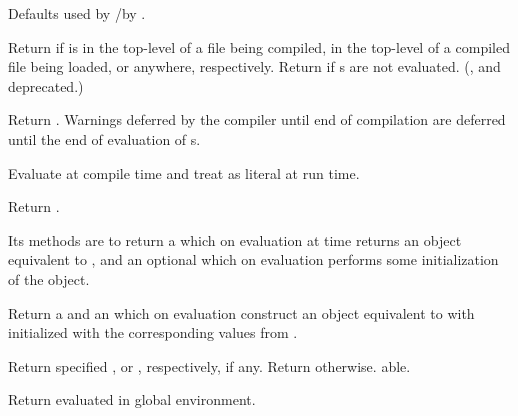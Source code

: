 \begin{LIST}{1cm}
  {
  Defaults used by /by .
  }

  {
  Return  if
   is in the top-level of a file being compiled, in the
  top-level of a compiled file being loaded, or anywhere,
  respectively. Return \retval{\NIL} if s are not
  evaluated. (,  and  deprecated.) 
  }

  {
  Return . Warnings deferred by the
  compiler until end of compilation are deferred until the end of
  evaluation of s. 
  }

  {
  Evaluate  at compile time and treat  as
  literal at run time. 
  }

  {
  Return .
  }

  {
  Its methods are to return a  which on
  evaluation at  time returns an object equivalent to
  , and an optional  which on
  evaluation performs some initialization of the object. 
  }

  {
  Return a  and an  which on evaluation construct an object equivalent to
   with  initialized with the corresponding values
  from . 
  }

  {
  Return specified , or , respectively, if any. Return \retval{\NIL}
  otherwise. able. 
  }
  
  {
  Return  evaluated in global environment.
  }

\end{LIST}



